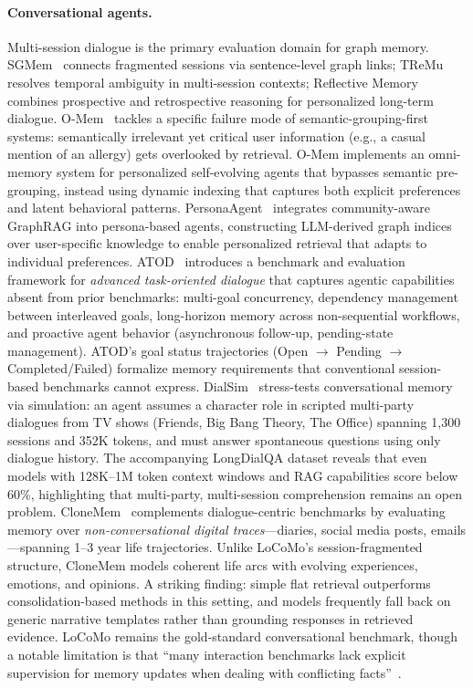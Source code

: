 \documentclass[hf]{ceurart}
\begin{document}
\paragraph{Conversational agents.}
Multi-session dialogue is the primary evaluation domain for graph
memory. SGMem~\cite{sgmem2025} connects fragmented sessions via
sentence-level graph links; TReMu~\cite{tremu2025} resolves temporal
ambiguity in multi-session contexts; Reflective
Memory~\cite{reflectivemem2025} combines prospective and retrospective
reasoning for personalized long-term dialogue.
O-Mem~\cite{omem2025} tackles a specific failure mode of
semantic-grouping-first systems: semantically irrelevant yet critical
user information (e.g., a casual mention of an allergy) gets
overlooked by retrieval. O-Mem implements an omni-memory system for
personalized self-evolving agents that bypasses semantic pre-grouping,
instead using dynamic indexing that captures both explicit preferences
and latent behavioral patterns.
PersonaAgent~\cite{personaagent2025} integrates community-aware
GraphRAG into persona-based agents, constructing LLM-derived graph
indices over user-specific knowledge to enable personalized
retrieval that adapts to individual preferences.
ATOD~\cite{atod2026} introduces a benchmark and evaluation framework
for \emph{advanced task-oriented dialogue} that captures agentic
capabilities absent from prior benchmarks: multi-goal concurrency,
dependency management between interleaved goals, long-horizon memory
across non-sequential workflows, and proactive agent behavior
(asynchronous follow-up, pending-state management). ATOD's goal
status trajectories (Open $\to$ Pending $\to$ Completed/Failed)
formalize memory requirements that conventional session-based
benchmarks cannot express.
DialSim~\cite{dialsim2026} stress-tests conversational memory
via simulation: an agent assumes a character role in scripted
multi-party dialogues from TV shows (Friends, Big Bang Theory, The
Office) spanning 1,300 sessions and 352K tokens, and must answer
spontaneous questions using only dialogue history. The accompanying
LongDialQA dataset reveals that even models with 128K--1M token
context windows and RAG capabilities score below 60\%, highlighting
that multi-party, multi-session comprehension remains an open
problem.
CloneMem~\cite{clonemem2026} complements dialogue-centric
benchmarks by evaluating memory over \emph{non-conversational
digital traces}---diaries, social media posts, emails---spanning
1--3 year life trajectories. Unlike LoCoMo's session-fragmented
structure, CloneMem models coherent life arcs with evolving
experiences, emotions, and opinions. A striking finding: simple
flat retrieval outperforms consolidation-based methods in this
setting, and models frequently fall back on generic narrative
templates rather than grounding responses in retrieved evidence.
LoCoMo remains the gold-standard conversational benchmark, though a
notable limitation is that ``many interaction benchmarks lack
explicit supervision for memory updates when dealing with
conflicting facts''~\cite{graphmemsurvey2026}.
\end{document}

